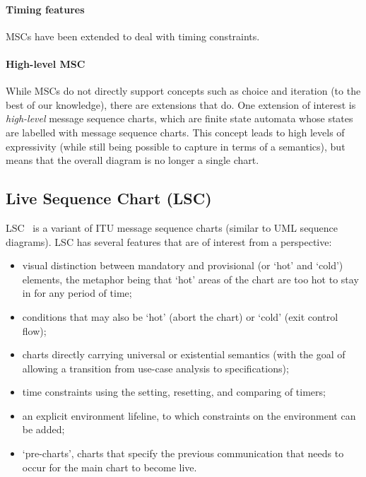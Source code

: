 \paragraph{Timing features}
MSCs have been extended to deal with timing constraints.

\paragraph{High-level MSC}

While MSCs do not directly support concepts such as choice and iteration
(to the best of our knowledge), there are extensions that do.  One extension
of interest is \emph{high-level} message sequence charts, which are finite state
automata whose states are labelled with message sequence charts.  This concept
leads to high levels of expressivity (while still being possible to capture in
terms of a semantics), but means that the overall diagram is no longer a single
chart.

\subsection{Live Sequence Chart (LSC)}

LSC~\cite{lsc} is a
variant of ITU message sequence charts (similar to UML sequence
diagrams).
LSC has several features that are of interest from a \langname{} perspective:

\begin{itemize}
\item visual distinction between mandatory and provisional (or `hot'
  and `cold') elements, the metaphor being that `hot' areas of the
  chart are too hot to stay in for any period of time;
\item conditions that may also be `hot' (abort the
  chart) or `cold' (exit control flow);
\item charts directly carrying universal or existential semantics (with the
  goal of allowing a transition from use-case analysis to specifications);
\item time constraints using the setting, resetting, and comparing of timers;
\item an explicit environment lifeline, to which constraints on the
  environment can be added;
\item `pre-charts', charts that specify the previous communication
  that needs to occur for the main chart to become live.
\end{itemize}


